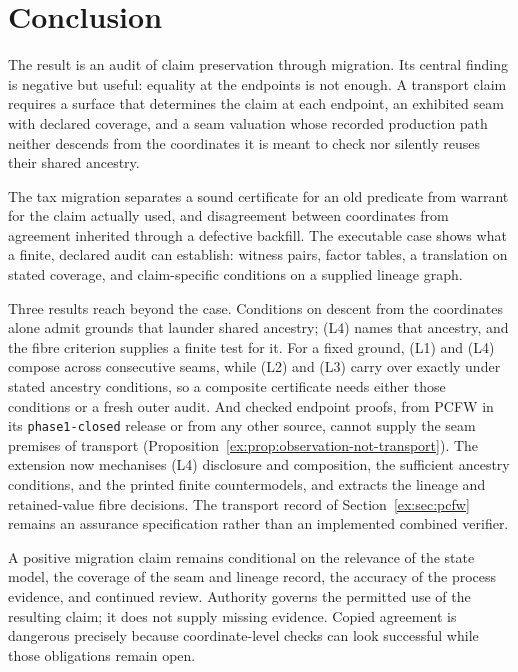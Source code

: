 \documentclass[11pt]{article}
\theoremstyle{definition}
\newcommand{\code}[1]{\texttt{#1}}
\begin{document}
\section{Conclusion}\label{ex:sec:conclusion}
The result is an audit of claim preservation through migration. Its central finding is negative but useful: equality at the endpoints is not enough. A transport claim requires a surface that determines the claim at each endpoint, an exhibited seam with declared coverage, and a seam valuation whose recorded production path neither descends from the coordinates it is meant to check nor silently reuses their shared ancestry.

The tax migration separates a sound certificate for an old predicate from warrant for the claim actually used, and disagreement between coordinates from agreement inherited through a defective backfill. The executable case shows what a finite, declared audit can establish: witness pairs, factor tables, a translation on stated coverage, and claim-specific conditions on a supplied lineage graph.

Three results reach beyond the case. Conditions on descent from the coordinates alone admit grounds that launder shared ancestry; (L4) names that ancestry, and the fibre criterion supplies a finite test for it. For a fixed ground, (L1) and (L4) compose across consecutive seams, while (L2) and (L3) carry over exactly under stated ancestry conditions, so a composite certificate needs either those conditions or a fresh outer audit. And checked endpoint proofs, from PCFW in its \code{phase1-closed} release or from any other source, cannot supply the seam premises of transport (Proposition~\ref{ex:prop:observation-not-transport}). The extension now mechanises (L4) disclosure and composition, the sufficient ancestry conditions, and the printed finite countermodels, and extracts the lineage and retained-value fibre decisions. The transport record of Section~\ref{ex:sec:pcfw} remains an assurance specification rather than an implemented combined verifier.

A positive migration claim remains conditional on the relevance of the state model, the coverage of the seam and lineage record, the accuracy of the process evidence, and continued review. Authority governs the permitted use of the resulting claim; it does not supply missing evidence. Copied agreement is dangerous precisely because coordinate-level checks can look successful while those obligations remain open.

\appendix
\end{document}
